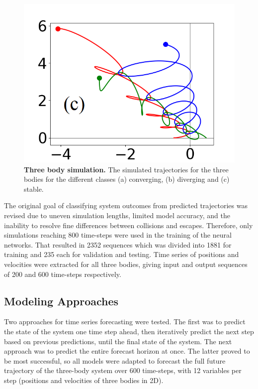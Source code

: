 \documentclass[%
 reprint,
 amsmath,amssymb,
 aps,
]{revtex4-2}
\begin{document}
\begin{figure}
\begin{minipage}{0.15723\textwidth}
        \includegraphics[width=\linewidth]{threebodies_13_marked.png}
    \end{minipage}

\caption{\textbf{Three body simulation.} The simulated trajectories for the three bodies for the different classes (a) converging, (b) diverging and (c) stable.}
\label{fig:classes}    
\end{figure}

The original goal of classifying system outcomes from predicted trajectories was revised due to uneven simulation lengths, limited model accuracy, and the inability to resolve fine differences between collisions and escapes. Therefore, only simulations reaching 800 time-steps were used in the training of the neural networks. That resulted in 2352 sequences which was divided into 1881 for training and 235 each for validation and testing. Time series of positions and velocities were extracted for all three bodies, giving input and output sequences of 200 and 600 time-steps respectively.


\subsection{Modeling Approaches}
Two approaches for time series forecasting were tested. The first was to predict the state of the system one time step ahead, then iteratively predict the next step based on previous predictions, until the final state of the system. The next approach was to predict the entire forecast horizon at once. The latter proved to be most successful, so all models were adapted to forecast the full future trajectory of the three-body system over 600 time-steps, with 12 variables per step (positions and velocities of three bodies in 2D). 
\end{document}
